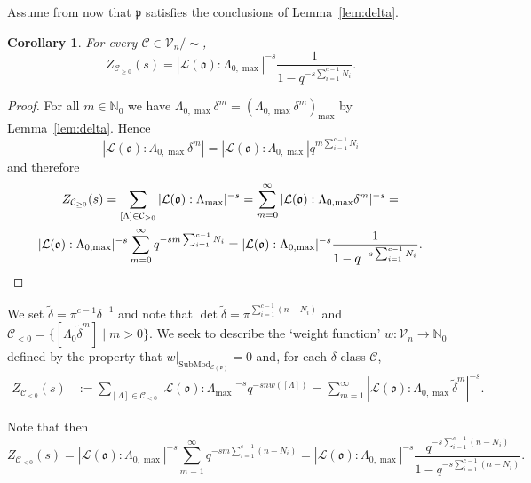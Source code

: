 \documentclass[11pt]{amsart}
\numberwithin{equation}{section}
\numberwithin{figure}{section}
\theoremstyle{plain}
\newtheorem{corollary}[theorem]{Corollary}
\theoremstyle{definition}
\theoremstyle{remark}
\begin{document}
Assume from now that ${\mathfrak{p}}$ satisfies the conclusions of
Lemma~\ref{lem:delta}.

\begin{corollary}\label{cor:pos}
  For every ${{\mathcal{C}}} \in {\ensuremath{\mathcal{V}}}_n/\sim$,
$$Z_{{{\mathcal{C}}}_{\geq0}}(s) = |{\ensuremath{\mathcal{L}}}({\mathfrak o}):\Lambda_{0,\max}|^{-s} \frac{1}{1-q^{-s\sum_{i=1}^{c-1}N_i}}.$$
\end{corollary}

\begin{proof} For all $m\in{\ensuremath{\mathbb{N}}}_0$ we have $\Lambda_{0,\max}\delta^m = \left(
  \Lambda_{0,\max}\delta^m \right)_{\max}$ by Lemma~\ref{lem:delta}.
Hence
$$|{\ensuremath{\mathcal{L}}}({\mathfrak o}):\Lambda_{0,\max}\delta^m| =
|{\ensuremath{\mathcal{L}}}({\mathfrak o}):\Lambda_{0,\max}|q^{m\sum_{i=1}^{c-1}N_i}$$ and therefore
\begin{multline*}
  Z_{{{\mathcal{C}}}_{\geq 0}}(s) = \sum_{[\Lambda]\in {{\mathcal{C}}}_{\geq
      0}}|{\ensuremath{\mathcal{L}}}({\mathfrak o}):\Lambda_{\max}|^{-s} = \sum_{m=0}^\infty | {\ensuremath{\mathcal{L}}}({\mathfrak o}): \Lambda_{0,\max}\delta^m |^{-s} =\\
  |{\ensuremath{\mathcal{L}}}({\mathfrak o}):\Lambda_{0,\max}|^{-s}\sum_{m=0}^\infty
  q^{-s m\sum_{i=1}^{c-1}N_i} = |{\ensuremath{\mathcal{L}}}({\mathfrak o}):\Lambda_{0,\max}|^{-s}
  \frac{1}{1-q^{-s\sum_{i=1}^{c-1}N_i}}.\qedhere
\end{multline*} \end{proof}

We set ${\widetilde{\delta}} = \pi^{c-1}\delta^{-1}$ and note that $\det
{\widetilde{\delta}} = \pi^{\sum_{i=1}^{c-1}(n-N_i)}$ and ${{\mathcal{C}}}_{<0} = \{
[\Lambda_0 {\widetilde{\delta}}^m] \mid m > 0\}$. We seek to describe the `weight
function' $w:{\ensuremath{\mathcal{V}}}_n{\rightarrow} {\ensuremath{\mathbb{N}}}_0$ defined by the property that
$w|_{\operatorname{SubMod}_{{\mathcal{E}}({\mathfrak o})}}=0$ and, for each $\delta$-class ${{\mathcal{C}}}$,
\begin{align}
  Z_{{{\mathcal{C}}}_{<0}}(s) &:=
  \sum_{[\Lambda]\in{{\mathcal{C}}}_{<0}}|{\ensuremath{\mathcal{L}}}({\mathfrak o}):\Lambda_{\max}|^{-s}q^{-s n
    w([\Lambda])} =
  \sum_{m=1}^\infty|{\ensuremath{\mathcal{L}}}({\mathfrak o}):\Lambda_{0,\max}{\widetilde{\delta}}^m|^{-s}\label{equ:weight}.
\end{align}

Note that then 
$$Z_{{{\mathcal{C}}}_{<0}}(s) = 
  |{\ensuremath{\mathcal{L}}}({\mathfrak o}):\Lambda_{0,\max}|^{-s} \sum_{m=1}^\infty q^{-s m
    \sum_{i=1}^{c-1}(n-N_i)} = |{\ensuremath{\mathcal{L}}}({\mathfrak o}):\Lambda_{0,\max}|^{-s}
  \frac{q^{-s\sum_{i=1}^{c-1}(n-N_i)}}{1-q^{-s\sum_{i=1}^{c-1}(n-N_i)}}.$$
\end{document}
